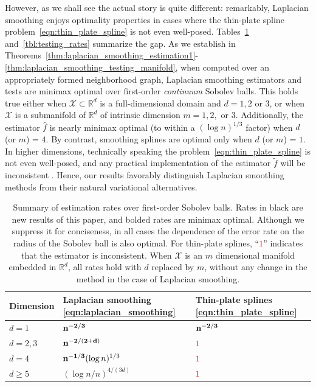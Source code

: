 \documentclass[twoside]{article}
\newcommand{\Reals}{\mathbb{R}}
\newcommand{\1}{\mathbf{1}}
\newcommand{\Rd}{\Reals^d}
\newcommand{\Xset}{\mathcal{X}}
\newcommand{\wt}[1]{\widetilde{#1}}
\newcommand{\wh}[1]{\widehat{#1}}
\theoremstyle{definition}
\theoremstyle{remark}
\begin{document}
However, as we shall see the actual story is quite different: remarkably, Laplacian smoothing enjoys optimality properties in cases where the thin-plate spline problem~\eqref{eqn:thin_plate_spline} is not even well-posed. Tables~\ref{tbl:estimation_rates} and~\ref{tbl:testing_rates} summarize the gap. As we establish in Theorems~\ref{thm:laplacian_smoothing_estimation1}-\ref{thm:laplacian_smoothing_testing_manifold}, when computed over an appropriately formed neighborhood graph, Laplacian smoothing estimators and tests are minimax optimal over first-order \emph{continuum} Sobolev balls. This holds true either when $\Xset \subset \Rd$ is a full-dimensional domain and $d = 1,2$ or $3$, or when $\Xset$ is a submanifold of $\Rd$ of intrinsic dimension $m = 1,2,$ or $3$. Additionally, the estimator $\wh{f}$ is nearly minimax optimal (to within a $(\log n)^{1/3}$ factor) when $d$ (or $m$) = $4$. By contrast, smoothing splines are optimal only when $d$ (or $m$) = $1$. In higher dimensions, technically speaking the problem~\eqref{eqn:thin_plate_spline} is not even well-posed, and any practical implementation of the estimator $\wt{f}$ will be inconsistent \citep{green93}. Hence, our results favorably distinguish Laplacian smoothing methods from their natural variational alternatives.
\begin{table}
	\begin{center}
		\begin{tabular}{p{} | p{} p{} }
			Dimension & Laplacian smoothing \eqref{eqn:laplacian_smoothing} & Thin-plate splines \eqref{eqn:thin_plate_spline} \\
			\hline
			$d = 1$ & ${\bf n^{-2/3}}$ & \textcolor{red}{${\bf n^{-2/3}}$} \\
			$d = 2,3$ & ${\bf n^{-2/(2 + d)}}$ & \textcolor{red}{$1$} \\
			$d = 4$ & ${\bf n^{-1/3}} (\log n)^{1/3}$ & \textcolor{red}{$1$} \\
			$d \geq 5$  & $(\log n/n)^{4/(3d)}$ &\textcolor{red}{$1$} \\
		\end{tabular}
	\end{center}
	\caption{Summary of estimation rates over first-order Sobolev balls. Rates in black are new results of this paper, and bolded rates are minimax optimal. Although we suppress it for conciseness, in all cases the dependence of the error rate on the radius of the Sobolev ball is also optimal. For thin-plate splines, ``\textcolor{red}{$1$}'' indicates that the estimator is inconsistent. When $\Xset$ is an $m$ dimensional manifold embedded in $\Rd$, all rates hold with $d$ replaced by $m$, without any change in the method in the case of Laplacian smoothing.}
	\label{tbl:estimation_rates}
\end{table}
\end{document}

